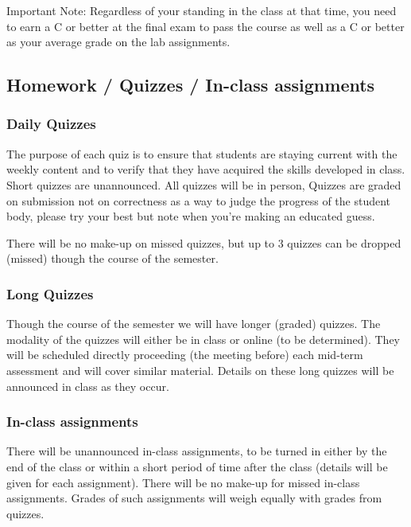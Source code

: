 \documentclass[12pt]{scrartcl}
\begin{document}
{\color{red} Important Note:} 
Regardless of your standing in the class at that time, you need to earn a C or better at the final exam to pass the course as well as a C or better as your average grade on the lab assignments. 

\subsection{Homework / Quizzes / In-class assignments}

\subsubsection{Daily Quizzes}
The purpose of each quiz is to ensure that students are staying current with the weekly content and to verify that they have acquired the skills developed in class. 
Short quizzes are unannounced. 
All quizzes will be in person, 
Quizzes are graded on submission not on correctness as a way to judge the progress of the student body, please try your best but note when you're making an educated guess. 

There will be no make-up on missed quizzes, but up to 3 quizzes can be dropped (missed) though the course of the semester.
 
 \subsubsection{Long Quizzes}
 Though the course of the semester we will have longer (graded) quizzes. 
 The modality of the quizzes will either be in class or online (to be determined). 
 They will be scheduled directly proceeding (the meeting before) each mid-term assessment and will cover similar material. 
 Details on these long quizzes will be announced in class as they occur. 
 
\subsubsection{In-class assignments}
There will be unannounced in-class assignments, to be turned in either by the end of the class or within a short period of time after the class (details will be given for each assignment). 
There will be no make-up for missed in-class assignments. 
Grades of such assignments will weigh equally with grades from quizzes. 
\end{document}
